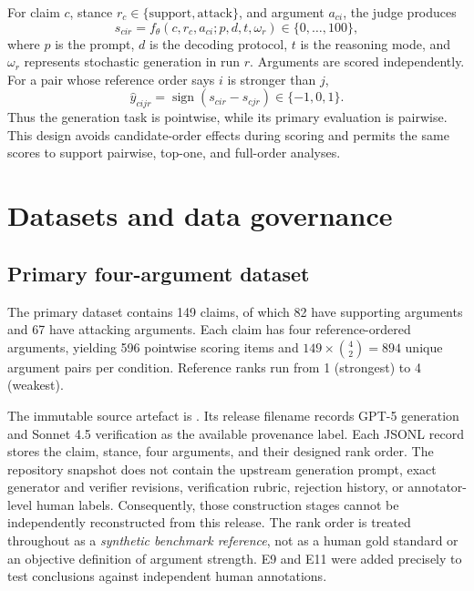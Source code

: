 \documentclass[11pt,twoside,a4paper]{report}
\begin{document}
For claim $c$, stance $r_c\in\{\text{support},\text{attack}\}$, and argument
$a_{ci}$, the judge produces
\begin{equation}
  s_{cir}=f_{\theta}(c,r_c,a_{ci};p,d,t,\omega_r)\in\{0,\ldots,100\},
  \label{eq:pointwise-score}
\end{equation}
where $p$ is the prompt, $d$ is the decoding protocol, $t$ is the reasoning mode,
and $\omega_r$ represents stochastic generation in run $r$.  Arguments are scored
independently.  For a pair whose reference order says $i$ is stronger than $j$,
\begin{equation}
  \widehat y_{cijr}=\operatorname{sign}(s_{cir}-s_{cjr})\in\{-1,0,1\}.
\end{equation}
Thus the generation task is pointwise, while its primary evaluation is pairwise.
This design avoids candidate-order effects during scoring and permits the same scores
to support pairwise, top-one, and full-order analyses.

\section{Datasets and data governance}
\label{sec:data-governance}

\subsection{Primary four-argument dataset}

The primary dataset contains 149 claims, of which 82 have supporting arguments and
67 have attacking arguments.  Each claim has four reference-ordered arguments,
yielding 596 pointwise scoring items and $149\times\binom{4}{2}=894$ unique argument
pairs per condition.  Reference ranks run from 1 (strongest) to 4 (weakest).

The immutable source artefact is
.
Its release filename records GPT-5 generation and Sonnet 4.5 verification as the
available provenance label.  Each JSONL record stores the claim, stance, four
arguments, and their designed rank order.  The repository snapshot does not contain
the upstream generation prompt, exact generator and verifier revisions, verification
rubric, rejection history, or annotator-level human labels.  Consequently, those
construction stages cannot be independently reconstructed from this release.  The
rank order is treated throughout as a \emph{synthetic benchmark reference}, not as a
human gold standard or an objective definition of argument strength.  E9 and E11
were added precisely to test conclusions against independent human annotations.
\end{document}
